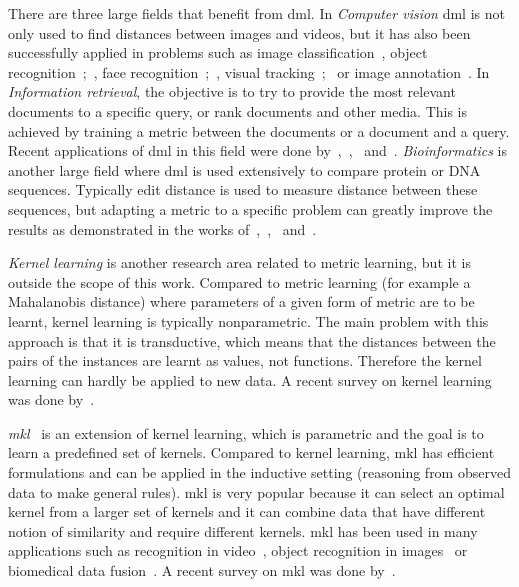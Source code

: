 There are three large fields that benefit from \ac{dml}. In \textit{Computer vision} \ac{dml} is not only used to find distances between images and videos, but it has also been successfully applied in problems such as image classification~\citep{mensink2012metric}, object recognition~\citep{frome2007learning};~\citep{verma2012learning}, face recognition~\citep{guillaumin2009you};~\citep{lu2014neighborhood}, visual tracking~\citep{li2012non};~\citep{jiang2012order} or image annotation~\citep{guillaumin2009tagprop}. In \textit{Information retrieval}, the objective is to try to provide the most relevant documents to a specific query, or rank documents and other media. This is achieved by training a metric between the documents or a document and a query. Recent applications of \ac{dml} in this field were done by~\citep{lebanon2006metric},~\citep{lee2008rank},~\citep{mcfee2010metric} and~\citep{lim2013robust}. \textit{Bioinformatics} is another large field where \ac{dml} is used extensively to compare protein or DNA sequences. Typically edit distance is used to measure distance between these sequences, but adapting a metric to a specific problem can greatly improve the results as demonstrated in the works of~\citep{xiong2006kernel},~\citep{saigo2006optimizing},~\citep{kato2010metric} and~\citep{wang2012prodis}.

\textit{Kernel learning} is another research area related to metric learning, but it is outside the scope of this work. Compared to metric learning (for example a Mahalanobis distance) where parameters of a given form of metric are to be learnt, kernel learning is typically nonparametric. The main problem with this approach is that it is transductive, which means that the distances between the pairs of the instances are learnt as values, not functions. Therefore the kernel learning can hardly be applied to new data. A recent survey on kernel learning was done by~\citep{abbasnejad2012survey}.

\textit{\Ac{mkl}}~\citep{gonen2011multiple} is an extension of kernel learning, which is parametric and the goal is to learn a predefined set of kernels. Compared to kernel learning, \ac{mkl} has efficient formulations and can be applied in the inductive setting (reasoning from observed data to make general rules). \Ac{mkl} is very popular because it can select an optimal kernel from a larger set of kernels and it can combine data that have different notion of similarity and require different kernels. \ac{mkl} has been used in many applications such as recognition in video~\citep{chen2013event}, object recognition in images~\citep{bucak2014multiple} or biomedical data fusion~\citep{yu20102}. A recent survey on \ac{mkl} was done by~\citep{gonen2011multiple}.

